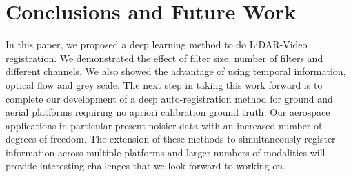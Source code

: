 \documentclass{article}
\begin{document}

\section{Conclusions and Future Work} %
\label{sec:conclusions_and_future_work}
In this paper, we proposed a deep learning method to do LiDAR-Video registration. We demonstrated the effect of filter size, number of filters and different channels. We also showed the advantage of using temporal information, optical flow and grey scale.
The next step in taking this work forward is to complete our development of a deep auto-registration method for ground and aerial platforms requiring no apriori calibration ground truth.  Our aerospace applications in particular present noisier data with an increased number of degrees of freedom. The extension of these methods to simultaneously register information across multiple platforms and larger numbers of modalities will provide interesting challenges that we look forward to working on. 






\end{document}
